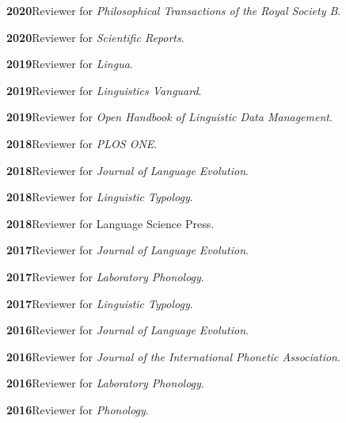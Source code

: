 \documentclass[11pt]{article}
\newcommand{\hangpara}{
 \setlength{\parindent}{0in} %
 \hangindent=0.42in %
}
\begin{document}
\vskip 6pt
\hangpara
{\bf 2020}\hspace{1ex}Reviewer for \textit{Philosophical Transactions of the Royal Society B}.

\vskip 6pt
\hangpara
{\bf 2020}\hspace{1ex}Reviewer for \textit{Scientific Reports}.

\vskip 6pt
\hangpara
{\bf 2019}\hspace{1ex}Reviewer for \textit{Lingua}.

\vskip 6pt
\hangpara
{\bf 2019}\hspace{1ex}Reviewer for \textit{Linguistics Vanguard}.

\vskip 6pt
\hangpara
{\bf 2019}\hspace{1ex}Reviewer for \textit{Open Handbook of Linguistic Data Management}.

\vskip 6pt
\hangpara
{\bf 2018}\hspace{1ex}Reviewer for \textit{PLOS ONE}.

\vskip 6pt
\hangpara
{\bf 2018}\hspace{1ex}Reviewer for \textit{Journal of Language Evolution}.

\vskip 6pt
\hangpara
{\bf 2018}\hspace{1ex}Reviewer for \textit{Linguistic Typology}.

\vskip 6pt
\hangpara
{\bf 2018}\hspace{1ex}Reviewer for Language Science Press.

\vskip 6pt
\hangpara
{\bf 2017}\hspace{1ex}Reviewer for \textit{Journal of Language Evolution}.

\vskip 6pt
\hangpara
{\bf 2017}\hspace{1ex}Reviewer for \textit{Laboratory Phonology}.

\vskip 6pt
\hangpara
{\bf 2017}\hspace{1ex}Reviewer for \textit{Linguistic Typology}.

\vskip 6pt
\hangpara
{\bf 2016}\hspace{1ex}Reviewer for \textit{Journal of Language Evolution}.

\vskip 6pt
\hangpara
{\bf 2016}\hspace{1ex}Reviewer for \textit{Journal of the International Phonetic Association}.

\vskip 6pt
\hangpara
{\bf 2016}\hspace{1ex}Reviewer for \textit{Laboratory Phonology}.

\vskip 6pt
\hangpara
{\bf 2016}\hspace{1ex}Reviewer for \textit{Phonology}.
\end{document}
